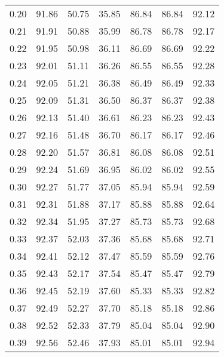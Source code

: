 \begin{tabular}{|c|c|c|c|c|c|c|}
      0.20 &     91.86 &     50.75 &      35.85 &   86.84 &      86.84 &         92.12 \\
      0.21 &     91.91 &     50.88 &      35.99 &   86.78 &      86.78 &         92.17 \\
      0.22 &     91.95 &     50.98 &      36.11 &   86.69 &      86.69 &         92.22 \\
      0.23 &     92.01 &     51.11 &      36.26 &   86.55 &      86.55 &         92.28 \\
      0.24 &     92.05 &     51.21 &      36.38 &   86.49 &      86.49 &         92.33 \\
      0.25 &     92.09 &     51.31 &      36.50 &   86.37 &      86.37 &         92.38 \\
      0.26 &     92.13 &     51.40 &      36.61 &   86.23 &      86.23 &         92.43 \\
      0.27 &     92.16 &     51.48 &      36.70 &   86.17 &      86.17 &         92.46 \\
      0.28 &     92.20 &     51.57 &      36.81 &   86.08 &      86.08 &         92.51 \\
      0.29 &     92.24 &     51.69 &      36.95 &   86.02 &      86.02 &         92.55 \\
      0.30 &     92.27 &     51.77 &      37.05 &   85.94 &      85.94 &         92.59 \\
      0.31 &     92.31 &     51.88 &      37.17 &   85.88 &      85.88 &         92.64 \\
      0.32 &     92.34 &     51.95 &      37.27 &   85.73 &      85.73 &         92.68 \\
      0.33 &     92.37 &     52.03 &      37.36 &   85.68 &      85.68 &         92.71 \\
      0.34 &     92.41 &     52.12 &      37.47 &   85.59 &      85.59 &         92.76 \\
      0.35 &     92.43 &     52.17 &      37.54 &   85.47 &      85.47 &         92.79 \\
      0.36 &     92.45 &     52.19 &      37.60 &   85.33 &      85.33 &         92.82 \\
      0.37 &     92.49 &     52.27 &      37.70 &   85.18 &      85.18 &         92.86 \\
      0.38 &     92.52 &     52.33 &      37.79 &   85.04 &      85.04 &         92.90 \\
      0.39 &     92.56 &     52.46 &      37.93 &   85.01 &      85.01 &         92.94 \\

\end{tabular}
